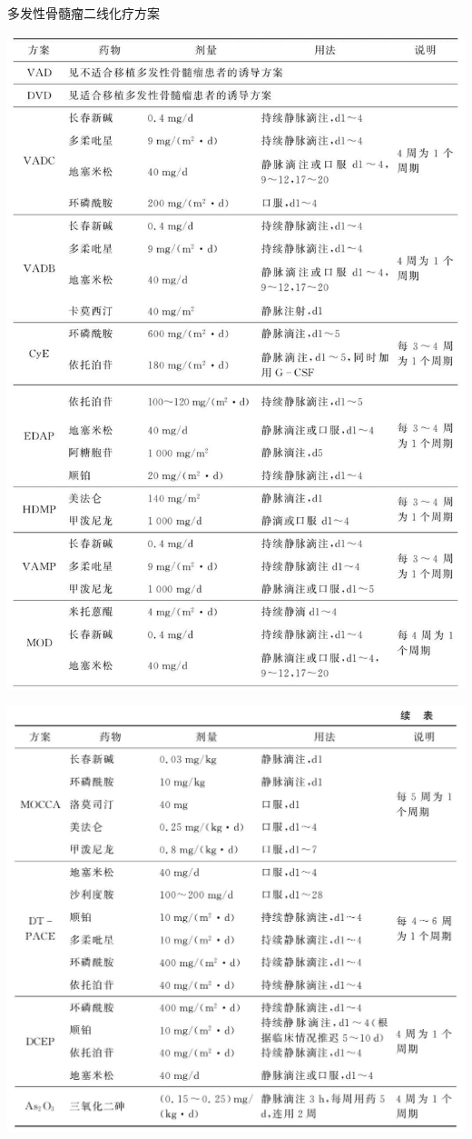 \begin{table}[htbp]
\centering
\caption{多发性骨髓瘤二线化疗方案}
\label{tab5-4-5}
\includegraphics{./images/Image00164.jpg}
\end{table}
\includegraphics{./images/Image00165.jpg}

